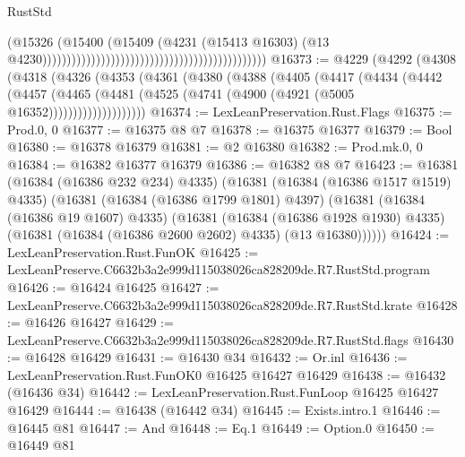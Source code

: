 \begin{lexlean}{RustStd}
\begin{coremodule}
                                                                                      (@15326
                                                                                        (@15400
                                                                                          (@15409
                                                                                            (@4231
                                                                                              (@15413
                                                                                                @16303)
                                                                                              (@13
                                                                                                @4230))))))))))))))))))))))))))))))))))))))))))))))
@16373 := @4229
    (@4292
      (@4308
        (@4318
          (@4326
            (@4353
              (@4361
                (@4380
                  (@4388
                    (@4405
                      (@4417
                        (@4434
                          (@4442
                            (@4457
                              (@4465
                                (@4481 (@4525 (@4741 (@4900 (@4921 (@5005 @16352))))))))))))))))))))
@16374 := LexLeanPreservation.Rust.Flags
@16375 := Prod.{0, 0}
@16377 := @16375 @8 @7
@16378 := @16375 @16377
@16379 := Bool
@16380 := @16378 @16379
@16381 := @2 @16380
@16382 := Prod.mk.{0, 0}
@16384 := @16382 @16377 @16379
@16386 := @16382 @8 @7
@16423 := @16381
    (@16384 (@16386 @232 @234) @4335)
    (@16381
      (@16384 (@16386 @1517 @1519) @4335)
      (@16381
        (@16384 (@16386 @1799 @1801) @4397)
        (@16381
          (@16384 (@16386 @19 @1607) @4335)
          (@16381
            (@16384 (@16386 @1928 @1930) @4335)
            (@16381 (@16384 (@16386 @2600 @2602) @4335) (@13 @16380))))))
@16424 := LexLeanPreservation.Rust.FunOK
@16425 := LexLeanPreserve.C6632b3a2e999d115038026ca828209de.R7.RustStd.program
@16426 := @16424 @16425
@16427 := LexLeanPreserve.C6632b3a2e999d115038026ca828209de.R7.RustStd.krate
@16428 := @16426 @16427
@16429 := LexLeanPreserve.C6632b3a2e999d115038026ca828209de.R7.RustStd.flags
@16430 := @16428 @16429
@16431 := @16430 @34
@16432 := Or.inl
@16436 := LexLeanPreservation.Rust.FunOK0 @16425 @16427 @16429
@16438 := @16432 (@16436 @34)
@16442 := LexLeanPreservation.Rust.FunLoop @16425 @16427 @16429
@16444 := @16438 (@16442 @34)
@16445 := Exists.intro.{1}
@16446 := @16445 @81
@16447 := And
@16448 := Eq.{1}
@16449 := Option.{0}
@16450 := @16449 @81

\end{coremodule}
\end{lexlean}

